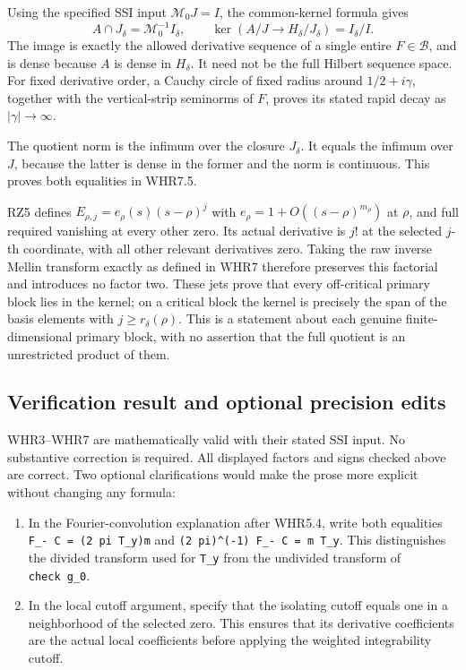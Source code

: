 Using the specified SSI input \(\mathcal M_0J=I\), the common-kernel
formula gives \[
A\cap J_\delta=\mathcal M_0^{-1}I_\delta,
\qquad
\ker(A/J\longrightarrow H_\delta/J_\delta)=I_\delta/I.
\] The image is exactly the allowed derivative sequence of a single
entire \(F\in\mathcal B\), and is dense because \(A\) is dense in
\(H_\delta\). It need not be the full Hilbert sequence space. For fixed
derivative order, a Cauchy circle of fixed radius around
\(1/2+i\gamma\), together with the vertical-strip seminorms of \(F\),
proves its stated rapid decay as \(|\gamma|\to\infty\).

The quotient norm is the infimum over the closure \(J_\delta\). It
equals the infimum over \(J\), because the latter is dense in the former
and the norm is continuous. This proves both equalities in WHR7.5.

RZ5 defines \(E_{\rho,j}=e_\rho(s)(s-\rho)^j\) with
\(e_\rho=1+O((s-\rho)^{m_\rho})\) at \(\rho\), and full required
vanishing at every other zero. Its actual derivative is \(j!\) at the
selected \(j\)-th coordinate, with all other relevant derivatives zero.
Taking the raw inverse Mellin transform exactly as defined in WHR7
therefore preserves this factorial and introduces no factor two. These
jets prove that every off-critical primary block lies in the kernel; on
a critical block the kernel is precisely the span of the basis elements
with \(j\ge r_\delta(\rho)\). This is a statement about each genuine
finite-dimensional primary block, with no assertion that the full
quotient is an unrestricted product of them.

\subsection{Verification result and optional precision
edits}\label{verification-result-and-optional-precision-edits}

WHR3--WHR7 are mathematically valid with their stated SSI input. No
substantive correction is required. All displayed factors and signs
checked above are correct. Two optional clarifications would make the
prose more explicit without changing any formula:

\begin{enumerate}
\def\labelenumi{\arabic{enumi}.}
\tightlist
\item
  In the Fourier-convolution explanation after WHR5.4, write both
  equalities \texttt{F\_-\ C\ =\ (2\ pi\ T\_y)m} and
  \texttt{(2\ pi)\^{}(-1)\ F\_-\ C\ =\ m\ T\_y}. This distinguishes the
  divided transform used for \texttt{T\_y} from the undivided transform
  of \texttt{check\ g\_0}.
\item
  In the local cutoff argument, specify that the isolating cutoff equals
  one in a neighborhood of the selected zero. This ensures that its
  derivative coefficients are the actual local coefficients before
  applying the weighted integrability cutoff.
\end{enumerate}

